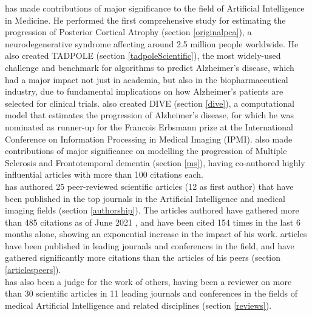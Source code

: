 \documentclass[11pt]{article}
\begin{document}
\dr has made contributions of major significance to the field of Artificial Intelligence in Medicine. He performed the first comprehensive study for estimating the progression of Posterior Cortical Atrophy (section \ref{originalpca}), a neurodegenerative syndrome affecting around 2.5 million people worldwide. He also created TADPOLE (section \ref{tadpoleScientific}), the most widely-used challenge and benchmark for algorithms to predict Alzheimer's disease, which had a major impact not just in academia, but also in the biopharmaceutical industry, due to fundamental implications on how Alzheimer's patients are selected for clinical trials. \dr also created DIVE (section \ref{dive}), a computational model that estimates the progression of Alzheimer's disease, for which he was nominated as runner-up for the Francois Erbsmann prize at the International Conference on Information Processing in Medical Imaging (IPMI). \dr also made contributions of major significance on modelling the progression of Multiple Sclerosis and Frontotemporal dementia (section \ref{ms}), having co-authored highly influential articles with more than 100 citations each. \\

\dr has authored 25 peer-reviewed scientific articles (12 as first author) that have been published in the top journals in the Artificial Intelligence and medical imaging fields (section \ref{authorship}). The articles \dr authored have gathered more than 485 citations as of June 2021 \cite{gscholar}, and have been cited 154 times in the last 6 months alone, showing an exponential increase in the impact of his work. \drs articles have been published in leading journals and conferences in the field, and have gathered significantly more citations than the articles of his peers (section \ref{articlespeers}). \\

\dr has also been a judge for the work of others, having been a reviewer on more than 30 scientific articles in 11 leading journals and conferences in the fields of medical Artificial Intelligence and related disciplines (section \ref{reviews}). \\
\end{document}
